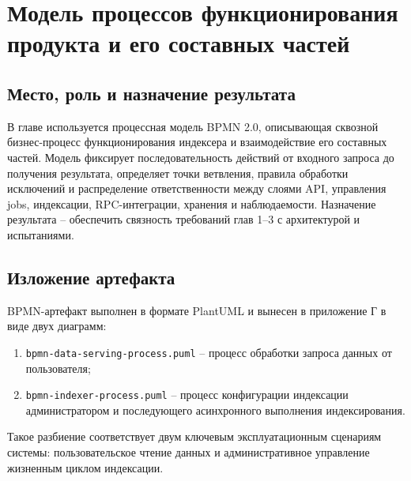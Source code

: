 ﻿\documentclass[14pt,a4paper]{extarticle}
\begin{document}
\newpage

\section{Модель процессов функционирования продукта и его составных частей}

\subsection{Место, роль и назначение результата}
\noindent В главе используется процессная модель BPMN 2.0, описывающая сквозной бизнес-процесс функционирования индексера и взаимодействие его составных частей. Модель фиксирует последовательность действий от входного запроса до получения результата, определяет точки ветвления, правила обработки исключений и распределение ответственности между слоями API, управления jobs, индексации, RPC-интеграции, хранения и наблюдаемости. Назначение результата -- обеспечить связность требований глав 1--3 с архитектурой и испытаниями.

\subsection{Изложение артефакта}
\noindent BPMN-артефакт выполнен в формате PlantUML и вынесен в приложение Г в виде двух диаграмм:
\begin{enumerate}
  \item \texttt{bpmn-data-serving-process.puml} -- процесс обработки запроса данных от пользователя;
  \item \texttt{bpmn-indexer-process.puml} -- процесс конфигурации индексации администратором и последующего асинхронного выполнения индексирования.
\end{enumerate}
\noindent Такое разбиение соответствует двум ключевым эксплуатационным сценариям системы: пользовательское чтение данных и административное управление жизненным циклом индексации.
\end{document}
